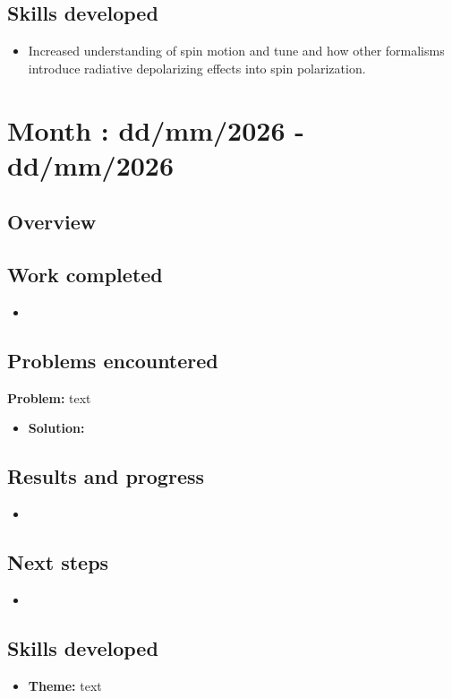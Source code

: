 \documentclass{article}
\begin{document}
\subsection{Skills developed}
\begin{itemize}
    \item Increased understanding of spin motion and tune and how other formalisms introduce radiative depolarizing effects into spin polarization.
\end{itemize}


\section{Month : dd/mm/2026 - dd/mm/2026}
\subsection{Overview}

\subsection{Work completed}

\begin{itemize}
\item
\end{itemize}

\subsection{Problems encountered}

\textbf{Problem:} text
\begin{itemize}
    \item \textbf{Solution:}
\end{itemize}

\subsection{Results and progress}
\begin{itemize}
    \item 
\end{itemize}

\subsection{Next steps}
\begin{itemize}
    \item 
\end{itemize}

\subsection{Skills developed}
\begin{itemize}
    \item \textbf{Theme:} text
\end{itemize}
\end{document}
